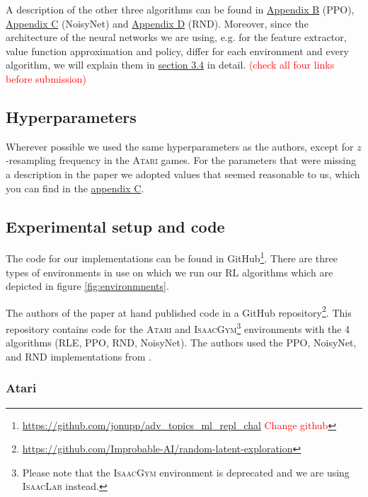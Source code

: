 \documentclass[10pt]{article} %
\begin{document}
\noindent A description of the other three algorithms can be found in \hyperlink{algo-ppo}{Appendix B} (PPO), \hyperlink{algo-noisynet}{Appendix C} (NoisyNet) and \hyperlink{algo-rnd}{Appendix D} (RND). Moreover, since the architecture of the neural networks we are using, e.g. for the feature extractor, value function approximation and policy, differ for each environment and every algorithm, we will explain them in \hyperlink{experimental-setup}{section 3.4} in detail. \textcolor{red}{(check all four links before submission)}

\hypertarget{hyperparameter-subsection}{\subsection{Hyperparameters}}

\noindent Wherever possible we used the same hyperparameters as the authors, except for $z$-resampling frequency in the \textsc{Atari} games. For the parameters that were missing a description in the paper we adopted values that seemed reasonable to us, which you can find in the \hyperlink{appendix-hyperparams}{appendix C}.

\hypertarget{experimental-setup}{\subsection{Experimental setup and code}}

\noindent The code for our implementations can be found in GitHub\footnote{\href{https://github.com/jonupp/adv_topics_ml_repl_chal}{https://github.com/jonupp/adv\_topics\_ml\_repl\_chal} \textcolor{red}{Change github}}. There are three types of environments in use on which we run our RL algorithms which are depicted in figure \ref{fig:environmnents}. 


\noindent The authors of the paper at hand published code in a GitHub repository\footnote{\href{https://github.com/Improbable-AI/random-latent-exploration}{https://github.com/Improbable-AI/random-latent-exploration}}. This repository contains code for the \textsc{Atari} and \textsc{IsaacGym}\footnote{Please note that the \textsc{IsaacGym} environment is deprecated and we are using \textsc{IsaacLab} instead.} environments with the 4 algorithms (RLE, PPO, RND, NoisyNet). The authors used the PPO, NoisyNet, and RND implementations from \cite{clearnrl-paper}.

\subsubsection{Atari}
\end{document}
